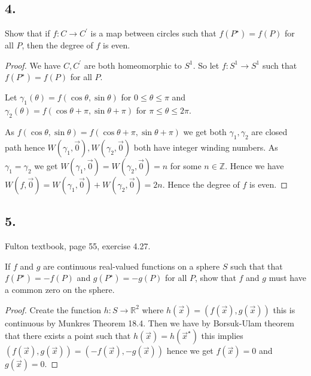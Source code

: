 \documentclass{amsart}
\theoremstyle{plain}
\theoremstyle{definition}
\theoremstyle{remark}
\begin{document}
\vspace{.15in}
\noindent
\subsection*{4.} Show that if $f:C\to C^\prime$ is a map between circles such that $f(P^\star)=f(P)$ for all $P$, then the degree of $f$ is even.

\begin{proof}
We have $C,C^\prime$ are both homeomorphic to $S^1$. So let $f:S^1\to S^1$ such that $f(P^\star)=f(P)$ for all $P$. 

Let $\gamma_1(\theta)=f(\cos \theta ,\sin \theta )$ for $0\leq \theta \leq \pi $ and $\gamma_2(\theta)=f(\cos \theta +\pi , \sin \theta+\pi)$ for $\pi \leq \theta \leq 2\pi$. 

As $f(\cos \theta,\sin \theta )=f(\cos \theta+\pi,\sin \theta+\pi)$ we get both $\gamma_1,\gamma_2$ are closed path hence $W(\gamma_1,\vec 0),W(\gamma_2,\vec 0)$ both have integer winding numbers. As $\gamma_1=\gamma_2$ we get $W(\gamma_1,\vec 0)=W(\gamma_2,\vec 0)=n$ for some $n\in \mathbb Z$. Hence we have $W(f,\vec 0)=W(\gamma_1,\vec 0)+W(\gamma_2,\vec 0)=2n$. Hence the degree of $f$ is even.

\end{proof}

\vspace{.15in}
\noindent
\subsection*{5.} Fulton textbook, page 55, exercise 4.27.

If $f$ and $g$ are continuous real-valued functions on a sphere $S$ such that that $f(P^\star)=-f(P)$ and $g(P^\star)=-g(P)$ for all $P$, show that $f$ and $g$ must have a common zero on the sphere. 

\begin{proof}
    Create the function $h:S\to \mathbb{R}^2$ where $h(\vec x)=(f(\vec x),g(\vec x))$ this is continuous by Munkres Theorem 18.4. Then we have by Borsuk-Ulam theorem that there exists a point such that $h(\vec x)=h(\vec x^\star)$ this implies $(f(\vec x),g(\vec x))=(-f(\vec x),-g(\vec x))$ hence we get $f(\vec x)= 0$ and $g(\vec x)=0$.
\end{proof}

 
\end{document}
